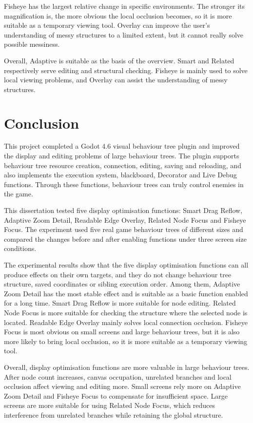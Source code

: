 \documentclass[11pt,a4paper,oneside,extrafontsizes]{memoir}
\begin{document}
Fisheye has the largest relative change in specific environments. The stronger its magnification is, the more obvious the local occlusion becomes, so it is more suitable as a temporary viewing tool. Overlay can improve the user's understanding of messy structures to a limited extent, but it cannot really solve possible messiness.

Overall, Adaptive is suitable as the basis of the overview. Smart and Related respectively serve editing and structural checking. Fisheye is mainly used to solve local viewing problems, and Overlay can assist the understanding of messy structures.

\chapter{Conclusion}

This project completed a Godot 4.6 visual behaviour tree plugin and improved the display and editing problems of large behaviour trees. The plugin supports behaviour tree resource creation, connection, editing, saving and reloading, and also implements the execution system, blackboard, Decorator and Live Debug functions. Through these functions, behaviour trees can truly control enemies in the game.

This dissertation tested five display optimisation functions: Smart Drag Reflow, Adaptive Zoom Detail, Readable Edge Overlay, Related Node Focus and Fisheye Focus. The experiment used five real game behaviour trees of different sizes and compared the changes before and after enabling functions under three screen size conditions.

The experimental results show that the five display optimisation functions can all produce effects on their own targets, and they do not change behaviour tree structure, saved coordinates or sibling execution order. Among them, Adaptive Zoom Detail has the most stable effect and is suitable as a basic function enabled for a long time. Smart Drag Reflow is more suitable for node editing. Related Node Focus is more suitable for checking the structure where the selected node is located. Readable Edge Overlay mainly solves local connection occlusion. Fisheye Focus is most obvious on small screens and large behaviour trees, but it is also more likely to bring local occlusion, so it is more suitable as a temporary viewing tool.

Overall, display optimisation functions are more valuable in large behaviour trees. After node count increases, canvas occupation, unrelated branches and local occlusion affect viewing and editing more. Small screens rely more on Adaptive Zoom Detail and Fisheye Focus to compensate for insufficient space. Large screens are more suitable for using Related Node Focus, which reduces interference from unrelated branches while retaining the global structure.
\end{document}
